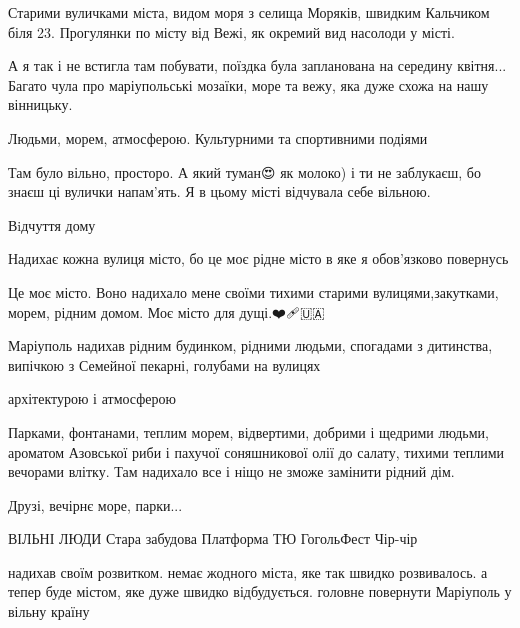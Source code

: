 
Старими вуличками міста, видом моря з селища Моряків, швидким Кальчиком біля
23. Прогулянки по місту від Вежі, як окремий вид насолоди у місті.


А я так і не встигла там побувати, поїздка була запланована на середину
квітня... Багато чула про маріупольські мозаїки, море та вежу, яка дуже схожа
на нашу вінницьку.


Людьми, морем, атмосферою. Культурними та спортивними подіями


Там було вільно, просторо. А який туман😍 як молоко) і ти не заблукаєш, бо
знаєш ці вулички напам'ять. Я в цьому місті відчувала себе вільною.


Вiдчуття дому


Надихає кожна вулиця місто, бо це моє рідне місто в яке я обов'язково повернусь


Це моє місто. Воно надихало мене своїми тихими старими вулицями,закутками,
морем, рідним домом. Моє місто для дущі.❤️🩹🇺🇦


Маріуполь надихав рідним будинком, рідними людьми, спогадами з дитинства,
випічкою з Семейної пекарні, голубами на вулицях


архітектурою і атмосферою


Парками, фонтанами, теплим морем, відвертими, добрими і щедрими людьми,
ароматом Азовської риби і пахучої соняшникової олії до салату, тихими теплими
вечорами влітку. Там надихало все і ніщо не зможе замінити рідний дім.


Друзі, вечірнє море, парки...


\obeycr
ВІЛЬНІ ЛЮДИ
Стара забудова
Платформа ТЮ
ГогольФест
Чір-чір
\restorecr


надихав своїм розвитком. немає жодного міста, яке так швидко розвивалось. а
тепер буде містом, яке дуже швидко відбудується. головне повернути Маріуполь у
вільну країну

